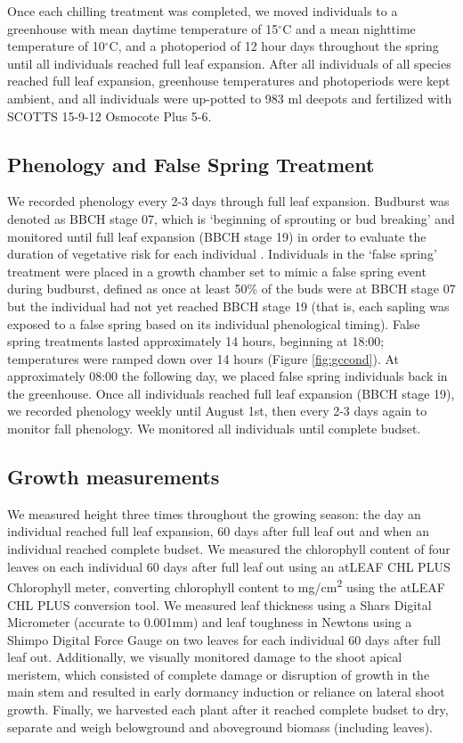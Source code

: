 \documentclass{article}\usepackage[]{graphicx}\usepackage[]{color}
\begin{document}
Once each chilling treatment was completed, we moved individuals to a greenhouse with mean daytime temperature of 15$^{\circ}$C and a mean nighttime temperature of 10$^{\circ}$C, and a photoperiod of 12 hour days throughout the spring until all individuals reached full leaf expansion. After all individuals of all species reached full leaf expansion, greenhouse temperatures and photoperiods were kept ambient, and all individuals were up-potted to 983 ml deepots and fertilized with SCOTTS 15-9-12 Osmocote Plus 5-6. 

\subsection*{Phenology and False Spring Treatment} 
We recorded phenology \citep[using the BBCH scale,][]{Meier2001} every 2-3 days through full leaf expansion. Budburst was denoted as BBCH stage 07, which is `beginning of sprouting or bud breaking' and monitored until full leaf expansion (BBCH stage 19) in order to evaluate the duration of vegetative risk \citep{Chamberlain2019} for each individual \citep{Finn2007}. Individuals in the `false spring' treatment were placed in a growth chamber set to mimic a false spring event during budburst, defined as once at least 50\% of the buds were at BBCH stage 07 but the individual had not yet reached BBCH stage 19 (that is, each sapling was exposed to a false spring based on its individual phenological timing). False spring treatments lasted approximately 14 hours, beginning at 18:00; temperatures were ramped down over 14 hours (Figure \ref{fig:gccond}). At approximately 08:00 the following day, we placed false spring individuals back in the greenhouse. Once all individuals reached full leaf expansion (BBCH stage 19), we recorded phenology weekly until August 1st, then every 2-3 days again to monitor fall phenology. We monitored all individuals until complete budset. 

\subsection*{Growth measurements}
We measured height three times throughout the growing season: the day an individual reached full leaf expansion, 60 days after full leaf out and when an individual reached complete budset. We measured the chlorophyll content of four leaves on each individual 60 days after full leaf out using an atLEAF CHL PLUS Chlorophyll meter, converting chlorophyll content to mg/cm\textsuperscript{2} using the atLEAF CHL PLUS conversion tool. We measured leaf thickness using a Shars Digital Micrometer (accurate to 0.001mm) and leaf toughness in Newtons using a Shimpo Digital Force Gauge on two leaves for each individual 60 days after full leaf out. Additionally, we visually monitored damage to the shoot apical meristem, which consisted of complete damage or disruption of growth in the main stem and resulted in early dormancy induction or reliance on lateral shoot growth. Finally, we harvested each plant after it reached complete budset to dry, separate and weigh belowground and aboveground biomass (including leaves). 
\end{document}
